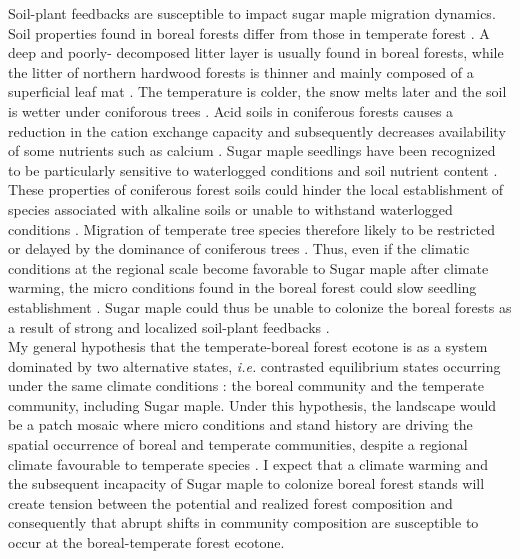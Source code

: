 Soil-plant feedbacks are susceptible to impact sugar maple migration dynamics.
Soil properties found in boreal forests differ from those in temperate forest
\cite{Lafleur2010,Barras1998,Goldblum2010,Demers1998}. A deep and poorly-
decomposed   litter layer is usually found in boreal forests, while the litter
of  northern hardwood forests is thinner and mainly composed of a superficial
leaf mat \cite{Barras1998}. The temperature is colder, the snow melts later
and the soil is wetter under coniforous trees \cite{Lafleur2010,Goldblum2010}.
Acid soils in coniferous forests causes a reduction in the cation exchange
capacity and subsequently decreases availability of some nutrients such as
calcium \cite{Moore2008}. Sugar maple seedlings have been recognized to be
particularly sensitive to waterlogged conditions and soil nutrient content
\cite{Moore2008,Lafleur2010,Cleavitt2011}. These properties of coniferous
forest soils could hinder the local establishment of species associated with
alkaline soils or unable to withstand waterlogged conditions
\cite{Lafleur2010}. Migration of temperate tree species therefore likely to be
restricted or delayed by the dominance of coniferous trees \cite{Lafleur2010}.
Thus, even if the climatic conditions at the regional scale become favorable
to Sugar maple after climate warming, the micro conditions found in the boreal
forest could slow seedling establishment
\cite{Kellman2004,Moore2008,Barras1998,Messier2011}. Sugar maple could thus be
unable to colonize the boreal forests as a result of strong and localized
soil-plant feedbacks \cite{McCarthyNeumann2012}.\\

My general hypothesis that the temperate-boreal forest ecotone is as a system
dominated by two alternative states, \textit{i.e.} contrasted equilibrium
states occurring under the same climate conditions
\cite{scheffer2009critical}: the boreal community and the temperate community,
including Sugar maple. Under this hypothesis, the landscape would be a patch
mosaic where micro conditions and stand history are driving the spatial
occurrence of boreal and temperate communities, despite a regional climate
favourable to temperate species \cite{Goldblum2010,Fisichelli2013}. I expect
that a climate warming and the subsequent incapacity of Sugar maple to
colonize boreal forest stands will create  tension between the potential and
realized forest composition and consequently that abrupt shifts in community
composition are susceptible to occur at the boreal-temperate forest ecotone.\\

